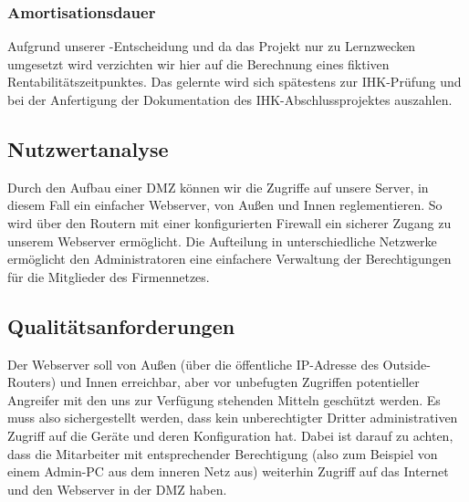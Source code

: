 
\subsubsection{Amortisationsdauer}
\label{sec:Amortisationsdauer}
Aufgrund unserer -Entscheidung und da das Projekt nur zu Lernzwecken umgesetzt wird verzichten wir hier auf die Berechnung eines fiktiven Rentabilitätszeitpunktes. Das gelernte wird sich spätestens zur \ac{IHK}-Prüfung und bei der Anfertigung der Dokumentation des \ac{IHK}-Abschlussprojektes auszahlen.

\subsection{Nutzwertanalyse}
\label{sec:Nutzwertanalyse}
Durch den Aufbau einer \ac{DMZ} können wir die Zugriffe auf unsere Server, in diesem Fall ein einfacher Webserver, von Außen und Innen reglementieren. So wird über den Routern mit einer konfigurierten Firewall ein sicherer Zugang zu unserem Webserver ermöglicht. Die Aufteilung in unterschiedliche Netzwerke ermöglicht den Administratoren eine einfachere Verwaltung der Berechtigungen für die Mitglieder des Firmennetzes.


\subsection{Qualitätsanforderungen}
\label{sec:Qualitaetsanforderungen}
Der Webserver soll von Außen (über die öffentliche \ac{IP}-Adresse des Outside-Routers) und Innen erreichbar, aber vor unbefugten Zugriffen potentieller Angreifer mit den uns zur Verfügung stehenden Mitteln geschützt werden. Es muss also sichergestellt werden, dass kein unberechtigter Dritter administrativen Zugriff auf die Geräte und deren Konfiguration hat. Dabei ist darauf zu achten, dass die Mitarbeiter mit entsprechender Berechtigung (also zum Beispiel von einem Admin-\ac{PC} aus dem inneren Netz aus) weiterhin Zugriff auf das Internet und den Webserver in der \ac{DMZ} haben.

